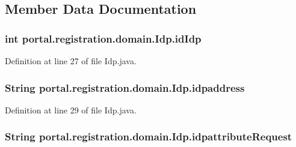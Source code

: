 \subsection{Member Data Documentation}
\hypertarget{classportal_1_1registration_1_1domain_1_1Idp_a73cc8adc0bc9d24116a0f5ca6ab8a2bf}{
\subsubsection[{idIdp}]{\setlength{\rightskip}{0pt plus 5cm}int {\bf portal.registration.domain.Idp.idIdp}}}
\label{classportal_1_1registration_1_1domain_1_1Idp_a73cc8adc0bc9d24116a0f5ca6ab8a2bf}


Definition at line 27 of file Idp.java.

\hypertarget{classportal_1_1registration_1_1domain_1_1Idp_a3eaa57b7e2ce7351be26c8eab9dba8e9}{
\subsubsection[{idpaddress}]{\setlength{\rightskip}{0pt plus 5cm}String {\bf portal.registration.domain.Idp.idpaddress}}}
\label{classportal_1_1registration_1_1domain_1_1Idp_a3eaa57b7e2ce7351be26c8eab9dba8e9}


Definition at line 29 of file Idp.java.

\hypertarget{classportal_1_1registration_1_1domain_1_1Idp_abf267afc4e5c91da690804e5abbef7df}{
\subsubsection[{idpattributeRequest}]{\setlength{\rightskip}{0pt plus 5cm}String {\bf portal.registration.domain.Idp.idpattributeRequest}}}
\label{classportal_1_1registration_1_1domain_1_1Idp_abf267afc4e5c91da690804e5abbef7df}


